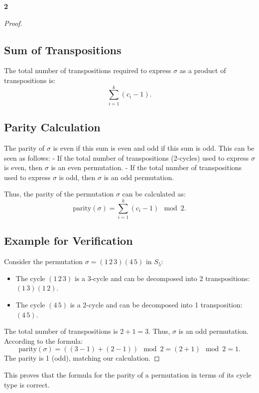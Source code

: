 \documentclass[12pt]{amsart}
\theoremstyle{definition}
\numberwithin{equation}{section}
\begin{document}
\begin{exercise}{\textbf{2}}
\begin{proof}
 \subsection*{Sum of Transpositions}
The total number of transpositions required to express \(\sigma\) as a product of transpositions is:
\[
\sum_{i=1}^{k} (c_i - 1).
\]

 \subsection*{Parity Calculation}
The parity of \(\sigma\) is even if this sum is even and odd if this sum is odd. This can be seen as follows:
- If the total number of transpositions (2-cycles) used to express \(\sigma\) is even, then \(\sigma\) is an even permutation.
- If the total number of transpositions used to express \(\sigma\) is odd, then \(\sigma\) is an odd permutation.

Thus, the parity of the permutation \(\sigma\) can be calculated as:
\[
\text{parity}(\sigma) = \sum_{i=1}^{k} (c_i - 1) \mod 2.
\]

 \subsection*{Example for Verification}
Consider the permutation \(\sigma = (1 \, 2 \, 3)(4 \, 5)\) in \(S_5\):
\begin{itemize}[label=--]
    \item The cycle \((1 \, 2 \, 3)\) is a 3-cycle and can be decomposed into 2 transpositions: \((1 \, 3)(1 \, 2)\).
    \item The cycle \((4 \, 5)\) is a 2-cycle and can be decomposed into 1 transposition: \((4 \, 5)\).
\end{itemize}
The total number of transpositions is \(2 + 1 = 3\). Thus, \(\sigma\) is an odd permutation. According to the formula:
\[
\text{parity}(\sigma) = ((3-1) + (2-1)) \mod 2 = (2 + 1) \mod 2 = 1.
\]
The parity is 1 (odd), matching our calculation.

\end{proof}

\noindent This proves that the formula for the parity of a permutation in terms of its cycle type is correct.
\end{exercise}
\newpage
\end{document}
